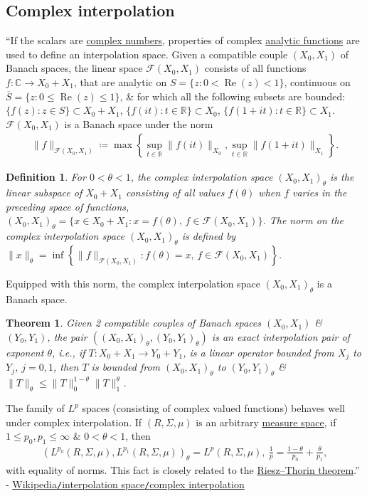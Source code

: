 \documentclass[oneside]{book}
\numberwithin{equation}{section}
\newtheorem{definition}{Definition}[chapter]
\newtheorem{theorem}{Theorem}[chapter]
\begin{document}
\subsection{Complex interpolation}
``If the scalars are \href{https://en.wikipedia.org/wiki/Complex_number}{complex numbers}, properties of complex \href{https://en.wikipedia.org/wiki/Analytic_function}{analytic functions} are used to define an interpolation space. Given a compatible couple $(X_0,X_1)$ of Banach spaces, the linear space $\mathcal{F}(X_0,X_1)$ consists of all functions $f:\mathbb{C}\to X_0 + X_1$, that are analytic on $S = \{z:0 < \operatorname{Re}(z) < 1\}$, continuous on $\overline{S} = \{z:0\le\operatorname{Re}(z)\le 1\}$, \& for which all the following subsets are bounded: $\{f(z):z\in S\}\subset X_0 + X_1$, $\{f(it):t\in\mathbb{R}\}\subset X_0$, $\{f(1 + it):t\in\mathbb{R}\}\subset X_1$. $\mathcal{F}(X_0,X_1)$ is a Banach space under the norm
\begin{align*}
	\|f\|_{\mathcal{F}(X_0,X_1)}\coloneqq\max\left\{\sup_{t\in\mathbb{R}} \|f(it)\|_{X_0},\sup_{t\in\mathbb{R}} \|f(1 + it)\|_{X_1}\right\}.
\end{align*}

\begin{definition}
	For $0 < \theta < 1$, the \emph{complex interpolation space} $(X_0,X_1)_\theta$ is the linear subspace of $X_0 + X_1$ consisting of all values $f(\theta)$ when $f$ varies in the preceding space of functions, $(X_0,X_1)_\theta = \{x\in X_0 + X_1:x = f(\theta),\,f\in\mathcal{F}(X_0,X_1)\}$. The norm on the complex interpolation space $(X_0,X_1)_\theta$ is defined by $\|x\|_\theta = \inf\left\{\|f\|_{\mathcal{F}(X_0,X_1)}:f(\theta) = x,\,f\in\mathcal{F}(X_0,X_1)\right\}$.
\end{definition}
Equipped with this norm, the complex interpolation space $(X_0,X_1)_\theta$ is a Banach space.

\begin{theorem}
	Given 2 compatible couples of Banach spaces $(X_0,X_1)$ \& $(Y_0,Y_1)$, the pair $((X_0,X_1)_\theta,(Y_0,Y_1)_\theta)$ is an exact interpolation pair of exponent $\theta$, i.e., if $T:X_0 + X_1\to Y_0 + Y_1$, is a linear operator bounded from $X_j$ to $Y_j$, $j = 0,1$, then $T$ is bounded from $(X_0,X_1)_\theta$ to $(Y_0,Y_1)_\theta$ \& $\|T\|_\theta\le\|T\|_0^{1-\theta}\|T\|_1^\theta$.
\end{theorem}
The family of $L^p$ spaces (consisting of complex valued functions) behaves well under complex interpolation. If $(R,\Sigma,\mu)$ is an arbitrary \href{https://en.wikipedia.org/wiki/Measure_(mathematics)}{measure space}, if $1\le p_0,p_1\le\infty$ \& $0 < \theta < 1$, then
\begin{align*}
	(L^{p_0}(R,\Sigma,\mu),L^{p_1}(R,\Sigma,\mu))_\theta = L^p(R,\Sigma,\mu),\ \frac{1}{p} = \frac{1 - \theta}{p_0} + \frac{\theta}{p_1},
\end{align*}
with equality of norms. This fact is closely related to the \href{https://en.wikipedia.org/wiki/Riesz%E2%80%93Thorin_theorem}{Riesz--Thorin theorem}.'' - \href{https://en.wikipedia.org/wiki/Interpolation_space#Complex_interpolation}{Wikipedia\texttt{/}interpolation space\texttt{/}complex interpolation}
\end{document}
